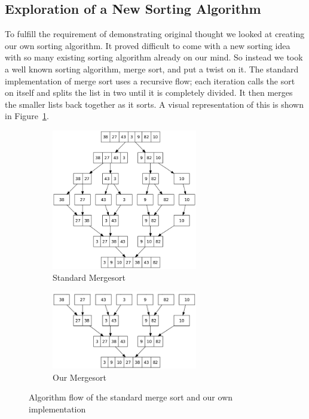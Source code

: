 \documentclass[12pt]{article}
\begin{document}
	\subsection{Exploration of a New Sorting Algorithm}
	
	To fulfill the requirement of demonstrating original thought we looked at creating our own sorting algorithm.
	It proved difficult to come with a new sorting idea with so many existing sorting algorithm already on our mind.
	So instead we took a well known sorting algorithm, merge sort, and put a twist on it.
	The standard implementation of merge sort uses a recursive flow; each iteration calls the sort on itself and splits the list in two until it is completely divided.
	It then merges the smaller lists back together as it sorts\cite{wiki-mergesort}.
	A visual representation of this is shown in Figure~\ref{fig:stdmerge}.
	
	
\begin{figure}[H]
	
	\begin{subfigure}{0.49\textwidth}
		\includegraphics[width=2.5in]{Merge_sort_algorithm_diagram.png} 
		\caption{Standard Mergesort}
		\label{fig:stdmerge}
	\end{subfigure}
	\begin{subfigure}{0.49\textwidth}
		\includegraphics[width=2.5in]{New_merge_sort_algorithm_diagram.png}
		\caption{Our Mergesort}
		\label{fig:newmerge}
	\end{subfigure}
	
	\caption{Algorithm flow of the standard merge sort and our own implementation}
	\label{fig:bothmerge}
\end{figure}
	
\end{document}
